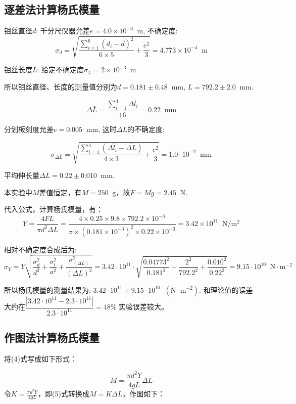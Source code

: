 \documentclass[11pt]{article}
\newcommand*{\unit}[1]{\mathop{}\!\mathrm{#1}}
\begin{document}
\subsection{逐差法计算杨氏模量}

钼丝直径$d$: 千分尺仪器允差$e = 4.0\times 10^{-6}\unit{m}$, 不确定度:
\[
    \sigma_d = \sqrt{\frac{\sum_{i=1}^{6} (d_i-\overline{d})^2}{6\times 5} + \frac{e^2}{3}} = 4.773 \times 10^{-4} \unit{m}
\]

钼丝长度$L$: 给定不确定度$\sigma_L = 2 \times 10^{-3} \unit{m}$

所以钼丝直径、长度的测量值分别为$d = 0.181 \pm 0.48 \unit{mm}$, $L = 792.2 \pm 2.0 \unit{mm}$.

\[
    \Delta \bar{L} = \frac{\sum_{i=1}^{4} \Delta \bar{l}_i}{16} = 0.22 \unit{mm}
\]

分划板刻度允差$e = 0.005\unit{mm}$, 这时$\Delta L$的不确定度: 

\[
    \sigma_{\Delta \bar{L}} = \sqrt{\frac{\sum_{i=1}^{4} (\Delta \bar{l}_i - \bar{\Delta L})}{4 \times 3} + \frac{e^2}{3}} = 1.0 \cdot 10^{-2} \unit{mm}
\]

平均伸长量$\Delta L = 0.22 \pm 0.010 \unit{mm}$.

本实验中$M$差值恒定，有$M=250 \unit{g}$，故$F = Mg = 2.45 \unit{N}$.

代入公式，计算杨氏模量，有：
\[
    Y = \frac{4FL}{\pi d^2 \Delta L} = \frac{4 \times 0.25 \times 9.8 \times 792.2 \times 10^{-3}}{\pi \times (0.181 \times 10^{-3})^2 \times 0.22 \times 10^{-3}} = 3.42 \times 10^{11} \unit{N/m^2}
\]

相对不确定度合成后为:
\[
    \sigma_Y = Y\sqrt{\frac{\sigma_d^2}{d^2} + \frac{\sigma_l^2}{a^2} + \frac{\sigma_{(\Delta L)}^2}{(\Delta L)^2}} = 3.42 \cdot 10^{11} \cdot \sqrt{\frac{0.04773^2}{0.181^2} + \frac{2^2}{792.2^2} + \frac{0.010^2}{0.22^2}} = 9.15 \cdot 10^{10} \unit{N \cdot m^{-2}}
\]

所以杨氏模量的测量结果为: $3.42 \cdot 10^{11}  \pm 9.15 \cdot 10^{10} \unit{(N \cdot m^{-2})}$. 和理论值的误差大约在$\dfrac{|3.42 \cdot 10^{11} - 2.3\cdot 10^{11}|}{2.3\cdot 10^{11}} = 48 \%$
实验误差较大。

\subsection{作图法计算杨氏模量}

将(4)式写成如下形式：

\begin{equation}
    M = \frac{\pi d^2 Y}{4gL} \Delta L
\end{equation}
令$\displaystyle K = \frac{\pi d^2 Y}{4gL}$，即(5)式转换成$M = K \Delta L$，作图如下：
\end{document}

